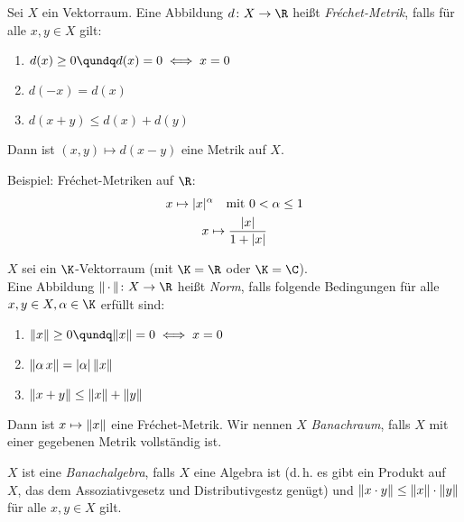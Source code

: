 \begin{thEmpty}
    Sei $X$ ein Vektorraum. Eine Abbildung $d\colon X\to\R$ heißt
    \emph{Fr\'echet-Metrik}, falls für alle $x,y\in X$ gilt:
    \begin{enumerate}[({F}1),labelsep=1em,leftmargin=2cm]
        \item
            $d(x) \geq 0 \qundq d(x)=0 \iff x=0$
        \item
            $d(-x) = d(x)$
        \item
            $d(x+y) \leq d(x) + d(y)$
    \end{enumerate}
    Dann ist $(x,y)\mapsto d(x-y)$ eine Metrik auf $X$.

    Beispiel: Fr\'echet-Metriken auf $\R$:
    \begin{gather*}
        x\mapsto \lvert x\rvert^\alpha \quad\text{mit $0<\alpha\leq1$}
        \\
        x\mapsto \frac{\lvert x\rvert}{1+\lvert x\rvert}
    \end{gather*}
\end{thEmpty}


\begin{thEmpty}[Norm]
    $X$ sei ein $\K$-Vektorraum (mit $\K=\R$ oder $\K=\C$).\\
    Eine Abbildung $\emptyNorm\colon X\to\R$ heißt \emph{Norm}, falls folgende
    Bedingungen für alle $x,y\in X,\alpha\in\K$ erfüllt sind:
    \begin{enumerate}[({N}1),labelsep=1em,leftmargin=2cm]
        \item 
            $\norm{x}\geq 0 \qundq \norm{x}=0 \iff x=0$
        \item
            $\lVert\alpha\,x\rVert = \lvert\alpha\rvert \, \lVert x\rVert$
        \item
            $\lVert x+y\rVert \leq \lVert x\rVert + \lVert y\rVert$
    \end{enumerate}
    Dann ist $x\mapsto\lVert x\rVert$ eine Fr\'echet-Metrik. Wir nennen $X$
    \emph{Banachraum}, falls $X$ mit einer gegebenen Metrik vollständig ist.
\end{thEmpty}

$X$ ist eine \emph{Banachalgebra}, falls $X$ eine Algebra ist (d.\,h. es gibt 
ein Produkt auf~$X$, das dem Assoziativgesetz und Distributivgestz genügt) und 
$\lVert x\cdot y\rVert \leq \lVert x\rVert \cdot \lVert y\rVert$ für alle $x,y\in X$ gilt.

